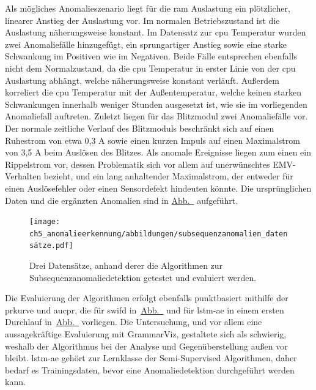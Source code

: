 Als mögliches Anomalieszenario liegt für die \ac{ram} Auslastung ein plötzlicher, linearer Anstieg der Auslastung vor. Im normalen Betriebszustand
ist die Auslastung näherungsweise konstant. Im Datensatz zur \ac{cpu} Temperatur wurden zwei Anomaliefälle hinzugefügt, ein sprungartiger Anstieg
sowie eine starke Schwankung im Positiven wie im Negativen. Beide Fälle entsprechen ebenfalls nicht dem Normalzustand, da die \ac{cpu} Temperatur
in erster Linie von der \ac{cpu} Auslastung abhängt, welche näherungsweise konstant verläuft. Außerdem korreliert die \ac{cpu} Temperatur
mit der Außentemperatur, welche keinen starken Schwankungen innerhalb weniger Stunden ausgesetzt ist, wie sie im vorliegenden Anomaliefall
auftreten. Zuletzt liegen für das Blitzmodul zwei Anomaliefälle vor. Der normale zeitliche Verlauf des Blitzmoduls beschränkt sich auf einen
Ruhestrom von etwa 0,3 A sowie einen kurzen Impuls auf einen Maximalstrom von 3,5 A beim Auslösen des Blitzes. Als anomale Ereignisse liegen
zum einen ein Rippelstrom vor, dessen Problematik sich vor allem auf unerwünschtes EMV-Verhalten bezieht, und ein lang anhaltender Maximalstrom,
der entweder für einen Auslösefehler oder einen Sensordefekt hindeuten könnte. Die ursprünglichen Daten und die ergänzten Anomalien sind in
\hyperref[fig:subsequenz_datensätze]{Abb.~} aufgeführt.

\begin{figure}[t!]
    \centering
        \texttt{[image: ch5\_anomalieerkennung/abbildungen/subsequenzanomalien\_datensätze.pdf]}
    \caption{\centering Drei Datensätze, anhand derer die Algorithmen zur Subsequenzanomaliedetektion getestet und evaluiert werden.}
    \label{fig:subsequenz_datensätze}
\end{figure}

Die Evaluierung der Algorithmen erfolgt ebenfalls punktbasiert mithilfe der \ac{prkurve} und \ac{aucpr}, die für \ac{swifd}
in~\hyperref[fig:SWIFD_AUC_PR]{Abb.~} und für \ac{lstm-ae} in einem ersten Durchlauf
in~\hyperref[fig:LSTMAE_AUC_PR_1]{Abb.~} vorliegen. Die Untersuchung, und vor allem eine aussagekräftige Evaluierung
mit GrammarViz, gestaltete sich als schwierig, weshalb der Algorithmus bei der Analyse und Gegenüberstellung außen vor bleibt. \ac{lstm-ae} gehört
zur Lernklasse der Semi-Supervised Algorithmen, daher bedarf es Trainingsdaten, bevor eine Anomaliedetektion durchgeführt werden kann.

